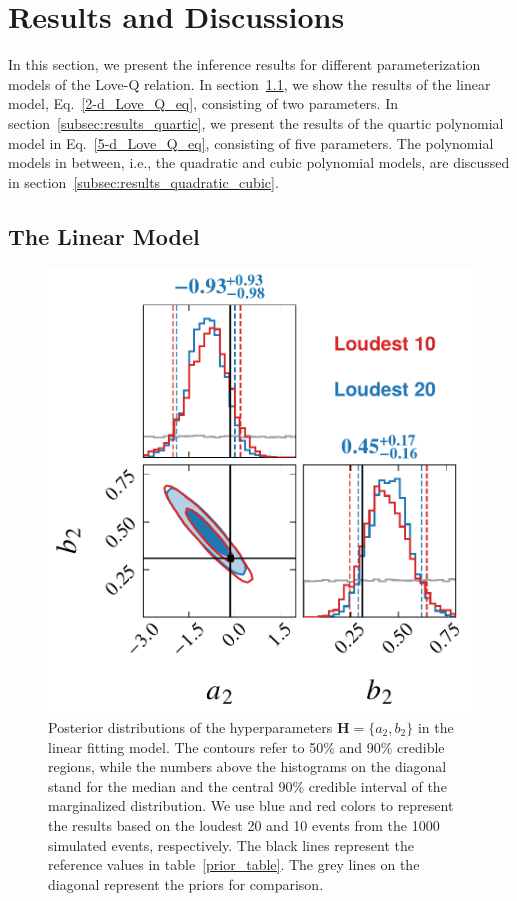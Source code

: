 \documentclass[a4paper,11pt]{article}
\begin{document}
\section{Results and Discussions}
\label{sec:results}

In this section, we present the inference results for different parameterization
models of the Love-Q relation. In section~\ref{subsec:results_linear_model}, we 
show the results of the linear model, Eq.~\eqref{2-d_Love_Q_eq}, consisting of
two parameters.  In section~\ref{subsec:results_quartic}, we present the results
of the quartic polynomial model in Eq.~\eqref{5-d_Love_Q_eq}, consisting of five
parameters. The polynomial models in between, i.e., the quadratic and cubic
polynomial models, are discussed in
section~\ref{subsec:results_quadratic_cubic}.

\subsection{The Linear Model}
\label{subsec:results_linear_model}

\begin{figure}[t]
    \centering
    \includegraphics[width=0.5\linewidth]{fig_comparison_corner_plot.pdf}
    \caption{Posterior distributions of the hyperparameters ${\bm H} =
    \{a_2,b_2\}$ in the linear fitting model. The contours refer to 50\% and
    90\% credible regions, while the numbers above the histograms on the
    diagonal stand for the median and the central 90\% credible interval of the marginalized distribution.
    We use blue and red colors to represent the results based on the loudest 20
    and 10 events from the 1000 simulated events, respectively.  The black lines
    represent the reference values in table~\ref{prior_table}.  The grey lines
    on the diagonal represent the priors for comparison.}
    \label{corner2-d}
\end{figure}
\end{document}
